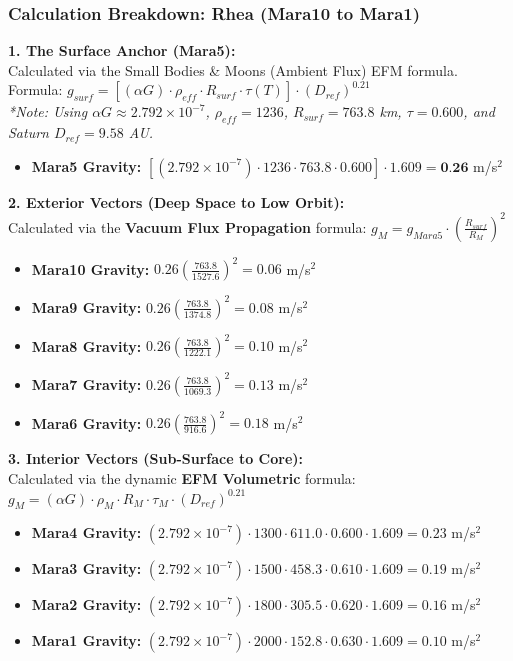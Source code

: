 \documentclass[11pt, a4paper]{article}
\begin{document}
\clearpage
\subsubsection{Calculation Breakdown: Rhea (Mara10 to Mara1)}

\noindent \textbf{1. The Surface Anchor (Mara5):} \\
Calculated via the Small Bodies \& Moons (Ambient Flux) EFM formula. \\
Formula: $g_{surf} = \left[ (\alpha G) \cdot \rho_{eff} \cdot R_{surf} \cdot \tau(T) \right] \cdot (D_{ref})^{0.21}$ \\
\textit{*Note: Using $\alpha G \approx 2.792 \times 10^{-7}$, $\rho_{eff} = 1236$, $R_{surf} = 763.8$ km, $\tau = 0.600$, and Saturn $D_{ref} = 9.58$ AU.}
\begin{itemize}
  \item \textbf{Mara5 Gravity:} $\left[ (2.792 \times 10^{-7}) \cdot 1236 \cdot 763.8 \cdot 0.600 \right] \cdot 1.609 = \textbf{0.26}$ m/s$^2$
\end{itemize}

\vspace{0.5em}
\noindent \textbf{2. Exterior Vectors (Deep Space to Low Orbit):} \\
Calculated via the \textbf{Vacuum Flux Propagation} formula: $g_M = g_{Mara5} \cdot \left( \frac{R_{surf}}{R_M} \right)^2$
\begin{itemize}
  \item \textbf{Mara10 Gravity:} $0.26 \left( \frac{763.8}{1527.6} \right)^2 = 0.06$ m/s$^2$
  \item \textbf{Mara9 Gravity:} $0.26 \left( \frac{763.8}{1374.8} \right)^2 = 0.08$ m/s$^2$
  \item \textbf{Mara8 Gravity:} $0.26 \left( \frac{763.8}{1222.1} \right)^2 = 0.10$ m/s$^2$
  \item \textbf{Mara7 Gravity:} $0.26 \left( \frac{763.8}{1069.3} \right)^2 = 0.13$ m/s$^2$
  \item \textbf{Mara6 Gravity:} $0.26 \left( \frac{763.8}{916.6} \right)^2 = 0.18$ m/s$^2$
\end{itemize}

\vspace{0.5em}
\noindent \textbf{3. Interior Vectors (Sub-Surface to Core):} \\
Calculated via the dynamic \textbf{EFM Volumetric} formula: $g_M = (\alpha G) \cdot \rho_{M} \cdot R_M \cdot \tau_M \cdot (D_{ref})^{0.21}$
\begin{itemize}
  \item \textbf{Mara4 Gravity:} $(2.792 \times 10^{-7}) \cdot 1300 \cdot 611.0 \cdot 0.600 \cdot 1.609 = 0.23$ m/s$^2$
  \item \textbf{Mara3 Gravity:} $(2.792 \times 10^{-7}) \cdot 1500 \cdot 458.3 \cdot 0.610 \cdot 1.609 = 0.19$ m/s$^2$
  \item \textbf{Mara2 Gravity:} $(2.792 \times 10^{-7}) \cdot 1800 \cdot 305.5 \cdot 0.620 \cdot 1.609 = 0.16$ m/s$^2$
  \item \textbf{Mara1 Gravity:} $(2.792 \times 10^{-7}) \cdot 2000 \cdot 152.8 \cdot 0.630 \cdot 1.609 = 0.10$ m/s$^2$
\end{itemize}
\end{document}
